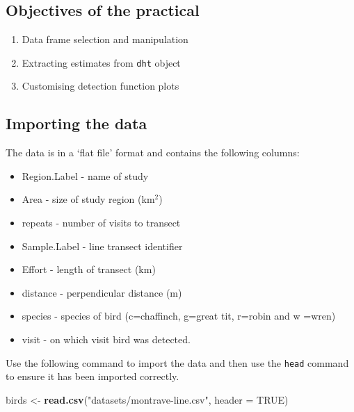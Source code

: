 \documentclass[10pt,a4paper]{tufte-handout}
\newenvironment{Shaded}{\begin{snugshade}}{\end{snugshade}}
\newcommand{\DataTypeTok}[1]{\textcolor[rgb]{0.13,0.29,0.53}{#1}}
\newcommand{\KeywordTok}[1]{\textcolor[rgb]{0.13,0.29,0.53}{\textbf{#1}}}
\newcommand{\NormalTok}[1]{#1}
\newcommand{\OtherTok}[1]{\textcolor[rgb]{0.56,0.35,0.01}{#1}}
\newcommand{\StringTok}[1]{\textcolor[rgb]{0.31,0.60,0.02}{#1}}
\providecommand{\tightlist}{%
  \setlength{\itemsep}{0pt}\setlength{\parskip}{0pt}}
\begin{document}
\hypertarget{objectives-of-the-practical}{%
\subsection{Objectives of the
practical}\label{objectives-of-the-practical}}

\begin{enumerate}
\def\labelenumi{\arabic{enumi}.}
\tightlist
\item
  Data frame selection and manipulation
\item
  Extracting estimates from \texttt{dht} object
\item
  Customising detection function plots
\end{enumerate}

\hypertarget{importing-the-data}{%
\subsection{Importing the data}\label{importing-the-data}}

The data is in a `flat file' format and contains the following columns:

\begin{itemize}
\tightlist
\item
  Region.Label - name of study
\item
  Area - size of study region (km\(^2\))
\item
  repeats - number of visits to transect
\item
  Sample.Label - line transect identifier
\item
  Effort - length of transect (km)
\item
  distance - perpendicular distance (m)
\item
  species - species of bird (c=chaffinch, g=great tit, r=robin and w
  =wren)
\item
  visit - on which visit bird was detected.
\end{itemize}

Use the following command to import the data and then use the
\texttt{head} command to ensure it has been imported correctly.

\begin{Shaded}
\begin{Highlighting}[]
\NormalTok{birds <-}\StringTok{ }\KeywordTok{read.csv}\NormalTok{(}\StringTok{"datasets/montrave-line.csv"}\NormalTok{, }
    \DataTypeTok{header =} \OtherTok{TRUE}\NormalTok{)}
\end{Highlighting}
\end{Shaded}
\end{document}
